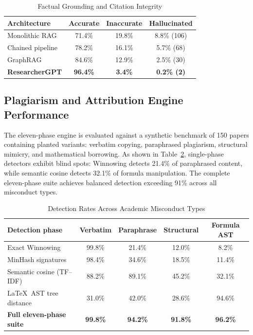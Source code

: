 \documentclass[conference]{IEEEtran}
\begin{document}
\begin{table}[!t]
\caption{Factual Grounding and Citation Integrity}
\label{tab:citation}
\centering
\footnotesize
\begin{tabular}{@{}lccc@{}}
\toprule
\textbf{Architecture} & \textbf{Accurate} & \textbf{Inaccurate} & \textbf{Hallucinated} \\
\midrule
Monolithic RAG & 71.4\% & 19.8\% & 8.8\% (106) \\
Chained pipeline & 78.2\% & 16.1\% & 5.7\% (68) \\
GraphRAG & 84.6\% & 12.9\% & 2.5\% (30) \\
\textbf{ResearcherGPT} & \textbf{96.4\%} & \textbf{3.4\%} & \textbf{0.2\% (2)} \\
\bottomrule
\end{tabular}
\end{table}

\subsection{Plagiarism and Attribution Engine Performance}
The eleven-phase engine is evaluated against a synthetic benchmark of 150 papers containing planted variants: verbatim copying, paraphrased plagiarism, structural mimicry, and mathematical borrowing. As shown in Table~\ref{tab:plagiarism}, single-phase detectors exhibit blind spots: Winnowing detects 21.4\% of paraphrased content, while semantic cosine detects 32.1\% of formula manipulation. The complete eleven-phase suite achieves balanced detection exceeding 91\% across all misconduct types.

\begin{table}[!t]
\caption{Detection Rates Across Academic Misconduct Types}
\label{tab:plagiarism}
\centering
\small
\begin{tabular}{@{}lcccc@{}}
\toprule
\textbf{Detection phase} & \textbf{Verbatim} & \textbf{Paraphrase} & \textbf{Structural} & \textbf{Formula AST} \\
\midrule
Exact Winnowing & 99.8\% & 21.4\% & 12.0\% & 8.2\% \\
MinHash signatures & 98.4\% & 34.6\% & 18.5\% & 11.4\% \\
Semantic cosine (TF--IDF) & 88.2\% & 89.1\% & 45.2\% & 32.1\% \\
\LaTeX\ AST tree distance & 31.0\% & 42.0\% & 28.6\% & 94.6\% \\
\textbf{Full eleven-phase suite} & \textbf{99.8\%} & \textbf{94.2\%} & \textbf{91.8\%} & \textbf{96.2\%} \\
\bottomrule
\end{tabular}
\end{table}
\end{document}
